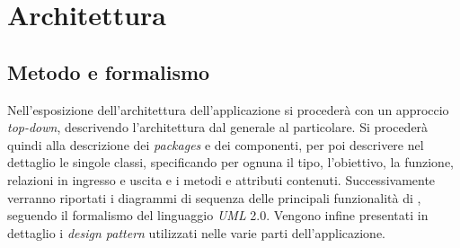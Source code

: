 \newpage
\section{Architettura}
\subsection{Metodo e formalismo}
Nell’esposizione dell’architettura dell’applicazione si procederà con un approccio \textit{top-down}, descrivendo l’architettura dal generale al particolare. Si procederà quindi alla descrizione dei \textit{packages} e dei componenti, per poi descrivere nel dettaglio le singole classi, specificando per ognuna il tipo, l’obiettivo, la funzione, relazioni in ingresso e uscita e i metodi e attributi contenuti. Successivamente verranno riportati i diagrammi di sequenza delle principali funzionalità di \progetto, seguendo il formalismo del linguaggio \textit{UML} 2.0. Vengono infine presentati in dettaglio i \textit{design pattern} utilizzati nelle varie parti dell'applicazione.
